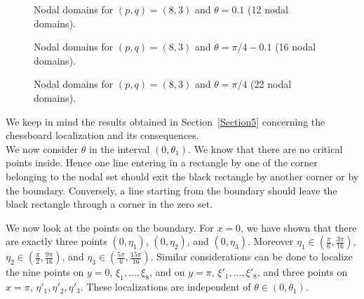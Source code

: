 \documentclass[a4paper,reqno,11pt]{amsart}
\theoremstyle{remark}
\theoremstyle{definition}
\numberwithin{equation}{section}
\begin{document}
\begin{figure}[ht]
\centering
{}
\caption{Nodal domains for $(p,q)= (8,3)$ and $\theta=0.1$ (12 nodal domains).}
\label{fig:8-3-chess-01}
\end{figure}

\begin{figure}[ht]
\centering
{}
\caption{Nodal domains for $(p,q)=(8,3)$ and  $\theta=\pi/4-0.1$ (16 nodal domains).}
\label{fig:8-3-thetapi4small}
\end{figure}

\begin{figure}[htbp]
\centering
{}
\caption{Nodal domains for $(p,q)= (8,3)$ and $\theta=\pi/4$ (22 nodal domains).}
\label{fig:8-3-thetapi4}
\end{figure}

 We keep in mind the results obtained in Section~\ref{Section5} concerning 
the chessboard localization and its consequences.\\
We now consider $\theta$ in the interval $(0,\theta_1)$. We know that there 
are no critical points inside. Hence one line entering in a rectangle by one 
of the corner belonging to the nodal set should exit the black rectangle by 
another corner or by the boundary. Conversely, a line starting from the 
boundary should leave the black rectangle through a corner in the zero set.

We now look at the points on the boundary. For $x=0$, we have shown that there 
are exactly three points $(0,\eta_1)$, $(0,\eta_2)$, and $(0,\eta_3)$. Moreover 
$\eta_1\in ( \frac{ \pi}{6}, \frac{3\pi}{16})$, 
$\eta_2 \in (\frac{\pi}{2}, \frac{9\pi}{16})$, and 
$\eta_3\in (\frac{5\pi}{6}, \frac{15 \pi}{16})$. Similar considerations can be 
done to localize the  nine  points on $y=0$, $\xi_1, \dots,\xi_8$,  and on 
$y=\pi$, $\xi'_1,\dots,\xi'_8$, and  three points on $x=\pi$, 
$ \eta'_1, \eta'_2,\eta'_3$. These localizations are independent of 
$\theta \in (0,\theta_1)$.
\end{document}
